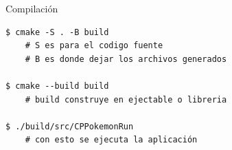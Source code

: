 \documentclass{beamer}
\begin{document}
\begin{frame}[fragile]{Compilación}
\begin{verbatim}
$ cmake -S . -B build 
    # S es para el codigo fuente
    # B es donde dejar los archivos generados

$ cmake --build build 
    # build construye en ejectable o libreria

$ ./build/src/CPPokemonRun
    # con esto se ejecuta la aplicación
\end{verbatim}
\end{frame}
%
%
%
%
\end{document}
